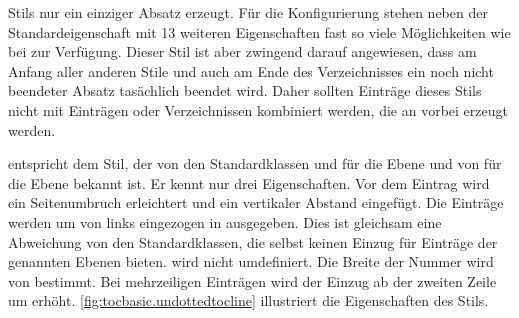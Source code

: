 \begin{description}
  Stils nur ein einziger Absatz erzeugt.  Für die Konfigurierung stehen neben
  der Standardeigenschaft  mit 13 weiteren Eigenschaften fast so viele Möglichkeiten
  wie bei  zur Verfügung. Dieser Stil ist aber zwingend darauf
  angewiesen, dass am Anfang aller anderen Stile und auch am Ende des
  Verzeichnisses ein noch nicht beendeter Absatz tasächlich beendet
  wird. Daher sollten Einträge dieses Stils nicht mit Einträgen oder
  Verzeichnissen kombiniert werden, die an  vorbei erzeugt
  werden.
\item[\PValue{undottedtocline}] entspricht dem Stil, der von den
  Standardklassen  und  für die Ebene
   und von  für die Ebene 
  bekannt ist. Er kennt nur drei Eigenschaften.
  Vor dem Eintrag wird ein Seitenumbruch erleichtert und ein vertikaler
  Abstand eingefügt. Die Einträge werden um  von links
  eingezogen in  ausgegeben. Dies ist gleichsam eine
  Abweichung von den Standardklassen, die selbst keinen Einzug für Einträge
  der genannten Ebenen bieten.  wird nicht
  umdefiniert. Die Breite der Nummer wird von  bestimmt. Bei
  mehrzeiligen Einträgen wird der Einzug ab der zweiten Zeile um
   erhöht. \autoref{fig:tocbasic.undottedtocline} illustriert
  die Eigenschaften des Stils.
  \begin{figure}
    \centering
\end{figure}
\end{description}
